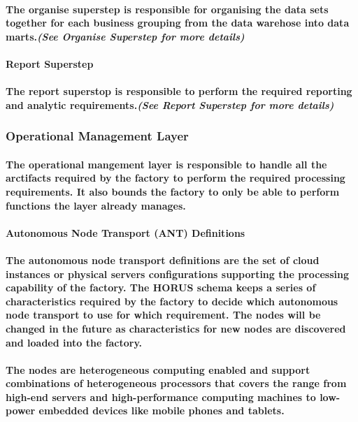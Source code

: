 \documentclass{acm_proc_article-sp}
\begin{document}
\paragraph{The organise superstep is responsible for organising the data sets together for each business grouping from the data warehose into data marts.\textit{(See Organise Superstep for more details)}}
\paragraph{\textbf{Report Superstep}}
\paragraph{The report superstop is responsible to perform the required reporting and analytic requirements.\textit{(See Report Superstep for more details)}}
\subsubsection{Operational Management Layer}
\paragraph{The operational mangement layer is responsible to handle all the arctifacts required by the factory to perform the required processing requirements. It also bounds the factory to only be able to perform functions the layer already manages.}
\paragraph{\textbf{Autonomous Node Transport (ANT) Definitions}}
\paragraph{The autonomous node transport definitions are the set of cloud instances or physical servers configurations supporting the processing capability of the factory. The HORUS schema keeps a series of characteristics required by the factory to decide which autonomous node transport to use for which requirement. The nodes will be changed in the future as characteristics for new nodes are discovered and loaded into the factory.}
\paragraph{The nodes are heterogeneous computing enabled and support combinations of heterogeneous processors that covers the range from high-end servers and high-performance computing machines to low-power embedded devices like mobile phones and tablets.}
\end{document}
